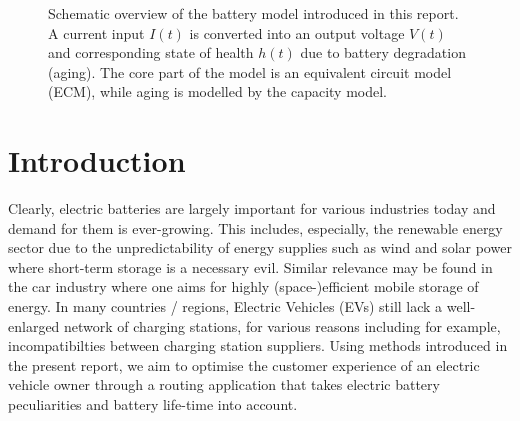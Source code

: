 \documentclass{prettytex/ox/mmsc-special-topic}
\title{\topictitle}
\author{Candidate \candidatenumber}
\date{\today}
\begin{document}
  \pagestyle{plain}
  \mmscSpecialHeader[casestudy]

  \begin{abstract}
    \label{abstract}
    This work will attempt to devise a mathematical model for Lithium-Ion batteries (cf. ) and, building on it, one for electric vehicles (EVs).
    We implement the EV model, which is just a first-order system of ODEs, using known solvers as well as a numerical forward integration scheme.
    We will use the implemented numerical simulator to make progress in a complex route finding problem using real-world road network data fetched from OpenStreetMap.

    The first part of this report will focus on the model for the battery which was the focus of our project. The second part is the route finding and optimisation problem in the context of electric vehicles.

    Our model was implemented in Python and MATLAB and there is a graphical user interface available with it that provides live insight into the model (cf. ).
  \end{abstract}

  \begin{figure}[H]
    \centering
    \caption{Schematic overview of the battery model introduced in this report. A current input $I(t)$ is converted into an output voltage $V(t)$ and corresponding state of health $h(t)$ due to battery degradation (aging). The core part of the model is an equivalent circuit model (ECM), while aging is modelled by the capacity model.}
    \label{fig:model-overview}
  \end{figure}


  \pagebreak
  \pagestyle{normal}

  \section{Introduction}
  Clearly, electric batteries are largely important for various industries today and demand for them is ever-growing.
  This includes, especially, the renewable energy sector due to the unpredictability of energy supplies such as wind and solar power where short-term storage is a necessary evil.
  Similar relevance may be found in the car industry where one aims for highly (space-)efficient mobile storage of energy.
  In many countries / regions, Electric Vehicles (EVs) still lack a well-enlarged network of charging stations, for various reasons including for example, incompatibilties between charging station suppliers.
  Using methods introduced in the present report, we aim to optimise the customer experience of an electric vehicle owner through a routing application that takes electric battery peculiarities and battery life-time into account.
\end{document}
